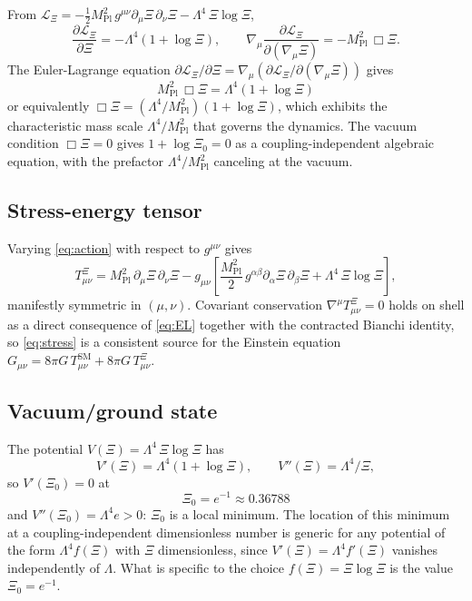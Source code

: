 \documentclass[11pt,reqno]{amsart}
\theoremstyle{plain}
\theoremstyle{definition}
\theoremstyle{remark}
\newcommand{\Pl}{\mathrm{Pl}}
\newcommand{\SM}{\mathrm{SM}}
\begin{document}
From $\mathcal{L}_\Xi = -\tfrac{1}{2} M_\Pl^{2}\, g^{\mu\nu}\partial_\mu\Xi\,\partial_\nu\Xi
- \Lambda^{4}\,\Xi\log\Xi$,
\[
  \frac{\partial \mathcal{L}_\Xi}{\partial \Xi} = -\Lambda^{4}(1 + \log\Xi),
  \qquad
  \nabla_\mu \frac{\partial \mathcal{L}_\Xi}{\partial(\nabla_\mu \Xi)}
  = -M_\Pl^{2}\,\Box\Xi.
\]
The Euler-Lagrange equation
$\partial\mathcal{L}_\Xi/\partial\Xi = \nabla_\mu(\partial\mathcal{L}_\Xi/\partial(\nabla_\mu\Xi))$
gives
\begin{equation}\label{eq:EL}
  \boxed{\;M_\Pl^{2}\,\Box\Xi = \Lambda^{4}(1 + \log\Xi)\;}
\end{equation}
or equivalently $\Box\Xi = (\Lambda^{4}/M_\Pl^{2})(1+\log\Xi)$, which
exhibits the characteristic mass scale $\Lambda^{4}/M_\Pl^{2}$ that
governs the dynamics. The vacuum condition $\Box\Xi = 0$ gives
$1 + \log\Xi_0 = 0$ as a coupling-independent algebraic equation, with
the prefactor $\Lambda^{4}/M_\Pl^{2}$ canceling at the vacuum.

\subsection{Stress-energy tensor}

Varying \eqref{eq:action} with respect to $g^{\mu\nu}$ gives
\begin{equation}\label{eq:stress}
  T^{\Xi}_{\mu\nu} = M_\Pl^{2}\,\partial_\mu\Xi\,\partial_\nu\Xi
  - g_{\mu\nu}\!\left[\frac{M_\Pl^{2}}{2}\,g^{\alpha\beta}\partial_\alpha\Xi\,\partial_\beta\Xi
  + \Lambda^{4}\,\Xi\log\Xi\right],
\end{equation}
manifestly symmetric in $(\mu, \nu)$. Covariant conservation
$\nabla^{\mu} T^{\Xi}_{\mu\nu} = 0$ holds on shell as a direct consequence
of \eqref{eq:EL} together with the contracted Bianchi identity, so
\eqref{eq:stress} is a consistent source for the Einstein equation
$G_{\mu\nu} = 8\pi G\, T^{\SM}_{\mu\nu} + 8\pi G\, T^{\Xi}_{\mu\nu}$.

\subsection{Vacuum/ground state}\label{sec:vacrenorm}

The potential $V(\Xi) = \Lambda^{4}\,\Xi\log\Xi$ has
\[
  V'(\Xi) = \Lambda^{4}(1 + \log\Xi),
  \qquad
  V''(\Xi) = \Lambda^{4}/\Xi,
\]
so $V'(\Xi_0) = 0$ at
\begin{equation}\label{eq:vacuum}
  \boxed{\;\Xi_0 = e^{-1} \approx 0.36788\;}
\end{equation}
and $V''(\Xi_0) = \Lambda^{4} e > 0$: $\Xi_0$ is a local minimum. The
location of this minimum at a coupling-independent dimensionless number
is generic for any potential of the form $\Lambda^{4} f(\Xi)$ with $\Xi$
dimensionless, since $V'(\Xi) = \Lambda^{4} f'(\Xi)$ vanishes
independently of $\Lambda$. What is specific to the choice
$f(\Xi) = \Xi\log\Xi$ is the value $\Xi_0 = e^{-1}$.
\end{document}
